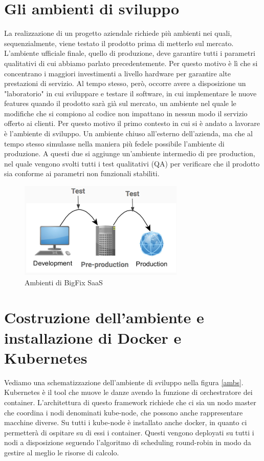 \section{Gli ambienti di sviluppo }
La realizzazione di un progetto aziendale richiede più ambienti nei quali, sequenzialmente, viene testato il prodotto prima di metterlo sul mercato. L'ambiente ufficiale finale, quello di produzione, deve garantire tutti i parametri qualitativi di cui abbiamo parlato precedentemente. Per questo motivo è lì che si concentrano i maggiori investimenti a livello hardware per garantire alte prestazioni di servizio. Al tempo stesso, però, occorre avere a disposizione un "laboratorio" in cui sviluppare e testare il software, in cui implementare le nuove features quando il prodotto sarà già sul mercato, un ambiente nel quale le modifiche che si compiono al codice non impattano in nessun modo il servizio offerto ai clienti. Per questo motivo il primo contesto in cui si è andato a lavorare è l'ambiente di sviluppo. Un ambiente chiuso all'esterno dell'azienda, ma che al tempo stesso simulasse nella maniera più fedele possibile l'ambiente di produzione. A questi due si aggiunge un'ambiente intermedio di pre production, nel quale vengono svolti tutti i test qualitativi (QA) per verificare che il prodotto sia conforme ai parametri non funzionali stabiliti. 
\begin{figure}[h!]
	\centering
	\includegraphics[width=0.7\textwidth,keepaspectratio=true]{capitoli/imgs/ambientisviluppo.png}
	\caption{Ambienti di BigFix SaaS}
\end{figure}

\section{Costruzione dell'ambiente e installazione di Docker e Kubernetes}
Vediamo una schematizzazione dell'ambiente di sviluppo nella figura \ref{ambs}. Kubernetes è il tool che muove le danze avendo la funzione di orchestratore dei container. L'architettura di questo framework richiede che ci sia un nodo master che coordina i nodi denominati kube-node, che possono anche rappresentare macchine diverse. Su tutti i kube-node è installato anche docker, in quanto ci permetterà di ospitare su di essi i container. Questi vengono deployati su tutti i nodi a disposizione seguendo l'algoritmo di scheduling round-robin in modo da gestire al meglio le risorse di calcolo. 
